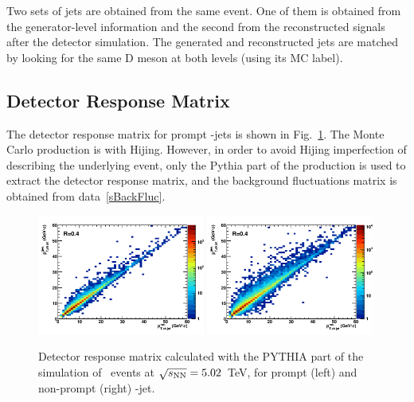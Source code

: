Two sets of jets are obtained from the same event. One of them is obtained from the generator-level information and the second from the reconstructed signals after the detector simulation. 
The generated and reconstructed jets are matched by looking for the same D meson at both levels (using its MC label).


\subsection{Detector Response Matrix}
\label{Det_Resp}

The detector response matrix for prompt \Dstar-jets is shown in Fig.~\ref{fig:fRMdet_pPb}.
The Monte Carlo production is with Hijing. However, in order to avoid Hijing imperfection of describing the underlying event, only the Pythia part of the production is used to extract the detector response matrix, and the background fluctuations matrix is obtained from data~\ref{sBackFluc}.

\begin{figure}[bth]
\centering
\includegraphics[width=0.49\textwidth]{pPbplots/ResponseMatrix/DetMatrix_Dpt0_100}
\includegraphics[width=0.49\textwidth]{pPbplots/ResponseMatrix/DetMatrix_Dpt0_100_FD}
\caption{Detector response matrix calculated with the PYTHIA part of the simulation of \pPb\ events at $\sqrt{s_{\rm NN}}=5.02$~TeV, for prompt (left) and non-prompt (right) \Dstar-jet.}
\label{fig:fRMdet_pPb}
\end{figure}

